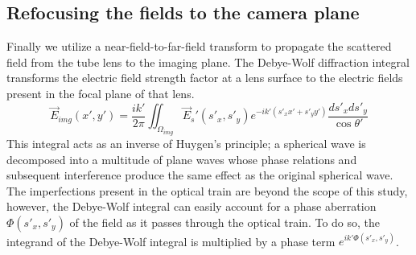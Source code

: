 \subsection{Refocusing the fields to the camera plane}
Finally we utilize a near-field-to-far-field transform to propagate the scattered
field from the tube lens to the imaging plane.
The Debye-Wolf diffraction integral transforms the electric field strength factor at a lens
surface to the electric fields present in the focal plane of that lens.
\begin{equation}
  \vec{E}_{img}(x', y') = \frac{i k'}{2 \pi} \iint_{\Omega_{img}} \vec{E}_s'(s'_x, s'_y) e^{-ik'(s'_xx'+s'_yy')}\frac{ds'_xds'_y}{\cos{\theta'}}
\end{equation}
This integral acts as an inverse of Huygen's principle; a spherical wave is
decomposed into a multitude of plane waves whose phase relations and subsequent
interference produce the same effect as the original spherical wave.
The imperfections present in the optical train are beyond the scope
of this study, however, the Debye-Wolf integral can easily account for a phase
aberration  $\Phi(s'_x,s'_y)$ of the field as it passes through the optical train.
To do so, the integrand of the Debye-Wolf integral is multiplied by a phase term
$e^{ik'\Phi(s'_x,s'_y)}$.


